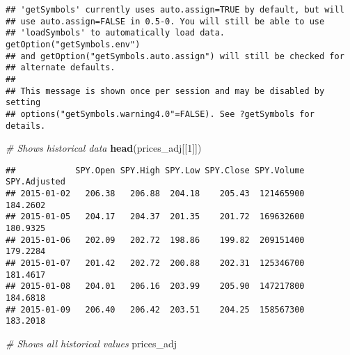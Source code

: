 \documentclass[
]{article}
\newenvironment{Shaded}{\begin{snugshade}}{\end{snugshade}}
\newcommand{\CommentTok}[1]{\textcolor[rgb]{0.56,0.35,0.01}{\textit{#1}}}
\newcommand{\DecValTok}[1]{\textcolor[rgb]{0.00,0.00,0.81}{#1}}
\newcommand{\KeywordTok}[1]{\textcolor[rgb]{0.13,0.29,0.53}{\textbf{#1}}}
\newcommand{\NormalTok}[1]{#1}
\begin{document}
\begin{verbatim}
## 'getSymbols' currently uses auto.assign=TRUE by default, but will
## use auto.assign=FALSE in 0.5-0. You will still be able to use
## 'loadSymbols' to automatically load data. getOption("getSymbols.env")
## and getOption("getSymbols.auto.assign") will still be checked for
## alternate defaults.
## 
## This message is shown once per session and may be disabled by setting 
## options("getSymbols.warning4.0"=FALSE). See ?getSymbols for details.
\end{verbatim}

\begin{Shaded}
\begin{Highlighting}[]
  \CommentTok{# Shows historical data  }
    \KeywordTok{head}\NormalTok{(prices_adj[[}\DecValTok{1}\NormalTok{]])}
\end{Highlighting}
\end{Shaded}

\begin{verbatim}
##            SPY.Open SPY.High SPY.Low SPY.Close SPY.Volume SPY.Adjusted
## 2015-01-02   206.38   206.88  204.18    205.43  121465900     184.2602
## 2015-01-05   204.17   204.37  201.35    201.72  169632600     180.9325
## 2015-01-06   202.09   202.72  198.86    199.82  209151400     179.2284
## 2015-01-07   201.42   202.72  200.88    202.31  125346700     181.4617
## 2015-01-08   204.01   206.16  203.99    205.90  147217800     184.6818
## 2015-01-09   206.40   206.42  203.51    204.25  158567300     183.2018
\end{verbatim}

\begin{Shaded}
\begin{Highlighting}[]
  \CommentTok{# Shows all historical values  }
\NormalTok{    prices_adj}
\end{Highlighting}
\end{Shaded}
\end{document}
